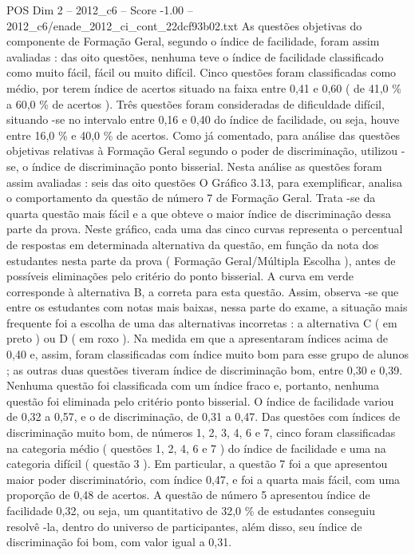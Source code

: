 \begin{textsample}{POS Dim 2 – 2012\_c6 – Score -1.00 – 2012\_c6/enade\_2012\_ci\_cont\_22dcf93b02.txt}
As questões objetivas do componente de Formação Geral, segundo o índice de facilidade, foram assim avaliadas : das oito questões, nenhuma teve o índice de facilidade classificado como muito fácil, fácil ou muito difícil.
Cinco questões foram classificadas como médio, por terem índice de acertos situado na faixa entre 0,41 e 0,60 ( de 41,0 \% a 60,0 \% de acertos ).
Três questões foram consideradas de dificuldade difícil, situando -se no intervalo entre 0,16 e 0,40 do índice de facilidade, ou seja, houve entre 16,0 \% e 40,0 \% de acertos.
Como já comentado, para análise das questões objetivas relativas à Formação Geral segundo o poder de discriminação, utilizou -se, o índice de discriminação ponto bisserial.
Nesta análise as questões foram assim avaliadas : seis das oito questões O Gráfico 3.13, para exemplificar, analisa o comportamento da questão de número 7 de Formação Geral.
Trata -se da quarta questão mais fácil e a que obteve o maior índice de discriminação dessa parte da prova.
Neste gráfico, cada uma das cinco curvas representa o percentual de respostas em determinada alternativa da questão, em função da nota dos estudantes nesta parte da prova ( Formação Geral/Múltipla Escolha ), antes de possíveis eliminações pelo critério do ponto bisserial.
A curva em verde corresponde à alternativa B, a correta para esta questão.
Assim, observa -se que entre os estudantes com notas mais baixas, nessa parte do exame, a situação mais frequente foi a escolha de uma das alternativas incorretas : a alternativa C ( em preto ) ou D ( em roxo ).
Na medida em que a apresentaram índices acima de 0,40 e, assim, foram classificadas com índice muito bom para esse grupo de alunos ; as outras duas questões tiveram índice de discriminação bom, entre 0,30 e 0,39.
Nenhuma questão foi classificada com um índice fraco e, portanto, nenhuma questão foi eliminada pelo critério ponto bisserial.
O índice de facilidade variou de 0,32 a 0,57, e o de discriminação, de 0,31 a 0,47.
Das questões com índices de discriminação muito bom, de números 1, 2, 3, 4, 6 e 7, cinco foram classificadas na categoria médio ( questões 1, 2, 4, 6 e 7 ) do índice de facilidade e uma na categoria difícil ( questão 3 ).
Em particular, a questão 7 foi a que apresentou maior poder discriminatório, com índice 0,47, e foi a quarta mais fácil, com uma proporção de 0,48 de acertos.
A questão de número 5 apresentou índice de facilidade 0,32, ou seja, um quantitativo de 32,0 \% de estudantes conseguiu resolvê -la, dentro do universo de participantes, além disso, seu índice de discriminação foi bom, com valor igual a 0,31.

\end{textsample}
